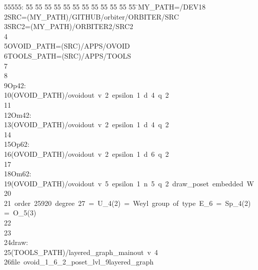 %
%
\begin{tabbing}
55555: \= 55 \= 55 \= 55 \= 55 \= 55 \= 55 \= 55 \= 55 \= 55 \= 55 \= 55 \= 55 \= \>MY\_PATH=/DEV18\\[0pt]
2\>SRC=(MY\_PATH)/GITHUB/orbiter/ORBITER/SRC\\[0pt]
3\>SRC2=(MY\_PATH)/ORBITER2/SRC2\\[0pt]
4\>\\[0pt]
5\>OVOID\_PATH=(SRC)/APPS/OVOID\\[0pt]
6\>TOOLS\_PATH=(SRC)/APPS/TOOLS\\[0pt]
7\>\\[0pt]
8\>\\[0pt]
9\>Op42:\\[0pt]
10\>\>(OVOID\_PATH)/ovoidout\ v\ 2\ epsilon\ 1\ d\ 4\ q\ 2\\[0pt]
11\>\\[0pt]
12\>Om42:\\[0pt]
13\>\>(OVOID\_PATH)/ovoidout\ v\ 2\ epsilon\ 1\ d\ 4\ q\ 2\\[0pt]
14\>\\[0pt]
15\>Op62:\\[0pt]
16\>\>(OVOID\_PATH)/ovoidout\ v\ 2\ epsilon\ 1\ d\ 6\ q\ 2\\[0pt]
17\>\\[0pt]
18\>Om62:\\[0pt]
19\>\>(OVOID\_PATH)/ovoidout\ v\ 5\ epsilon\ 1\ n\ 5\ q\ 2\ draw\_poset\ embedded\ W\\[0pt]
20\>\\[0pt]
21\>\ order\ 25920\ degree\ 27\ =\ U\_4(2)\ =\ Weyl\ group\ of\ type\ E\_6\ =\ Sp\_4(2)\ =\ O\_5(3)\\[0pt]
22\>\\[0pt]
23\>\\[0pt]
24\>draw:\\[0pt]
25\>\>(TOOLS\_PATH)/layered\_graph\_mainout\ v\ 4\ \\[0pt]
26\>\>\>file\ ovoid\_1\_6\_2\_poset\_lvl\_9layered\_graph\ \\[0pt]

\end{tabbing}
